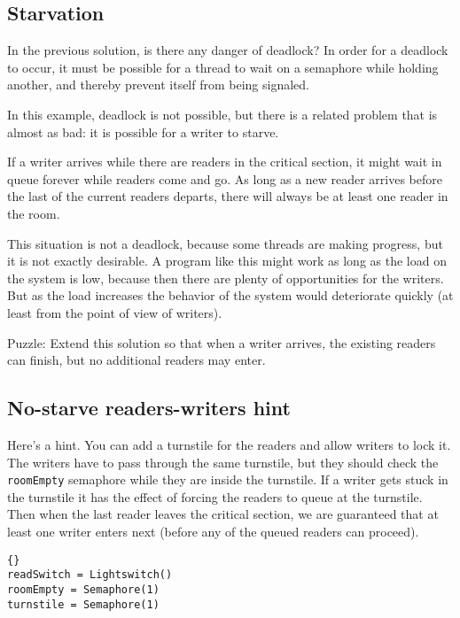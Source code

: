 \documentclass{book}
\newcommand{\clearemptydoublepage}{\newpage\cleardoublepage}
\begin{document}
\subsection{Starvation}

In the previous solution, is there any danger of deadlock?
In order for a deadlock to occur, it must be possible for a
thread to wait on a semaphore while holding another, and thereby
prevent itself from being signaled.

In this example, deadlock is not possible, but there is a related
problem that is almost as bad: it is possible for a writer to
starve.

If a writer arrives while there are readers in the critical section,
it might wait in queue forever while readers come and go.  As long
as a new reader arrives before the last of the current readers
departs, there will always be at least one reader in the room.

This situation is not a deadlock, because some threads are making
progress, but it is not exactly desirable.  A program like this
might work as long as the load on the system is low, because then there
are plenty of opportunities for the writers.  But as the load
increases the behavior of the system would deteriorate quickly
(at least from the point of view of writers).

Puzzle: Extend this solution so that when a writer arrives,
the existing readers can finish, but no additional readers
may enter.


\clearemptydoublepage
\subsection {No-starve readers-writers hint}  

Here's a hint.  You can add a turnstile for the readers and
allow writers to lock it.  The writers have to pass through
the same turnstile, but they should check the {\tt roomEmpty}
semaphore while they are inside the turnstile.  If a writer
gets stuck in the turnstile it has the effect of forcing the
readers to queue at the turnstile.  Then when the last reader
leaves the critical section, we are guaranteed that at least
one writer enters next (before any of the queued readers can
proceed).

\begin{lstlisting}[title={No-starve readers-writers initialization}]{}
readSwitch = Lightswitch()
roomEmpty = Semaphore(1)
turnstile = Semaphore(1)
\end{lstlisting}
\end{document}
